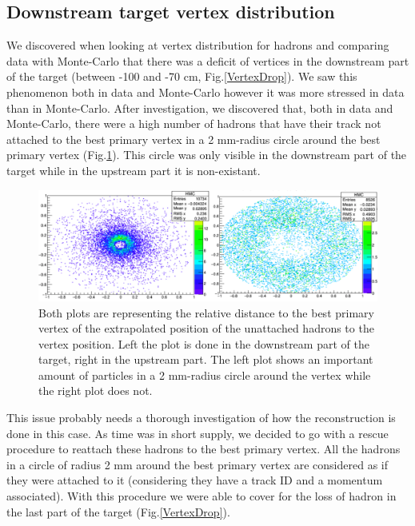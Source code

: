 \documentclass[letterpaper,12pt]{article}
\begin{document}
\subsection{Downstream target vertex distribution}

We discovered when looking at vertex distribution for hadrons and comparing data with Monte-Carlo that there was a deficit of vertices in the downstream part of the target (between -100 and -70 cm, Fig.\ref{VertexDrop}). We saw this phenomenon both in data and Monte-Carlo however it was more stressed in data than in Monte-Carlo. After investigation, we discovered that, both in data and Monte-Carlo, there were a high number of hadrons that have their track not attached to the best primary vertex in a 2 mm-radius circle around the best primary vertex (Fig.\ref{CircleHadron}). This circle was only visible in the downstream part of the target while in the upstream part it is non-existant.

\begin{figure}[!h]
	\includegraphics[scale=0.45]{./gfx/CircleHadron.png}
	\caption{Both plots are representing the relative distance to the best primary vertex of the extrapolated position of the unattached hadrons to the vertex position. Left the plot is done in the downstream part of the target, right in the upstream part. The left plot shows an important amount of particles in a 2 mm-radius circle around the vertex while the right plot does not.}
	\label{CircleHadron}
\end{figure}

This issue probably needs a thorough investigation of how the reconstruction is done in this case. As time was in short supply, we decided to go with a rescue procedure to reattach these hadrons to the best primary vertex. All the hadrons in a circle of radius 2 mm around the best primary vertex are considered as if they were attached to it (considering they have a track ID and a momentum associated). With this procedure we were able to cover for the loss of hadron in the last part of the target (Fig.\ref{VertexDrop}).
\end{document}
